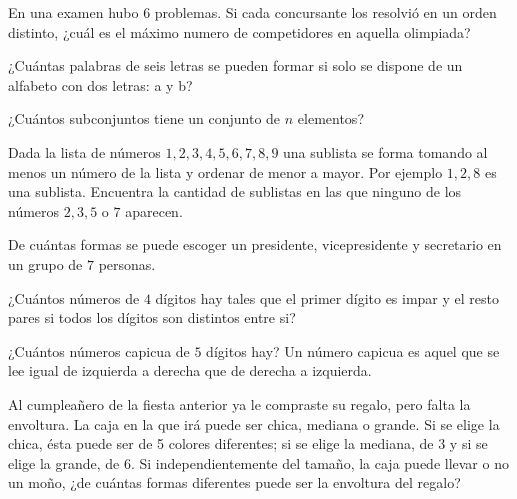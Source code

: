 \begin{problem}[$3 \clubsuit$]
    En una examen hubo $6$ problemas. Si cada concursante 
    los resolvió en un orden distinto, ¿cuál es el máximo 
    numero de competidores en aquella olimpiada?
\end{problem}

\begin{problem}[$2 \clubsuit$]
    ¿Cuántas palabras de seis letras se pueden formar si 
    solo se dispone de un alfabeto con dos letras: a y b?
\end{problem}

\begin{dproblem}[$3 \clubsuit$]
    ¿Cuántos subconjuntos tiene un conjunto de $n$ elementos?
\end{dproblem}

\begin{problem}
    Dada la lista de números \(1, 2, 3, 4, 5, 6, 7, 8, 9\) 
    una sublista se forma tomando al menos un número de la 
    lista y ordenar de menor a mayor. Por ejemplo \(1, 2, 8\) 
    es una sublista. Encuentra la cantidad de sublistas en las 
    que ninguno de los números \(2, 3, 5\) o \(7\) aparecen.
\end{problem}

\begin{problem}[$2 \clubsuit$]
    De cuántas formas se puede escoger un presidente, 
    vicepresidente y secretario en un grupo de $7$ personas.
\end{problem}

\begin{problem}[$3 \clubsuit$]
    ¿Cuántos números de $4$ dígitos hay tales que el primer 
    dígito es impar y el resto pares si todos los dígitos 
    son distintos entre si?
\end{problem}

\begin{problem}[$2 \clubsuit$]
    ¿Cuántos números capicua de $5$ dígitos hay? Un número 
    capicua es aquel que se lee igual de izquierda a 
    derecha que de derecha a izquierda.
\end{problem}

\begin{problem}[$4 \clubsuit$]
    Al cumpleañero de la fiesta anterior ya le compraste su 
    regalo, pero falta la envoltura. La caja en la que irá puede 
    ser chica, mediana o grande. Si se elige la chica, ésta 
    puede ser de 5 colores diferentes; si se elige la mediana, 
    de 3 y si se elige la grande, de 6. Si independientemente 
    del tamaño, la caja puede llevar o no un moño, ¿de cuántas 
    formas diferentes puede ser la envoltura del regalo?
\end{problem}

